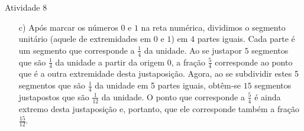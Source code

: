\begin{multicols}{2}
\begin{resposta*}{Atividade 8}
\begin{enumerate} [\quad a)]
\begin{tikzpicture}[x=1mm,y=1mm,scale=1.45]
          \end{tikzpicture}


\end{enumerate} %
%
\begin{enumerate}[a)]

    \item[c)] Após marcar os números       $0$       e       $1$       na reta
numérica, dividimos o segmento unitário (aquele de extremidades em       $0$
  e       $1$) em       $4$       partes iguais. Cada parte é um segmento que
corresponde a       $\frac{1}{4}$       da unidade. Ao se justapor       $5$
  segmentos que são       $\frac{1}{4}$       da unidade a partir da origem 0, a
fração       $\frac{5}{4}$       corresponde ao ponto que é a outra extremidade
desta justaposição. Agora, ao se subdividir estes 5 segmentos que são
$\frac{1}{4}$       da unidade em 5 partes iguais, obtêm-se       $15$
segmentos justapostos que são       $\frac{1}{12}$       da unidade. O ponto que
corresponde a       $\frac{5}{4}$       é ainda extremo desta justaposição e,
portanto, que ele corresponde também a fração       $\frac{15}{12}$.



\begin{center}



\end{center}
\end{enumerate}
\end{resposta*}
\end{multicols}

